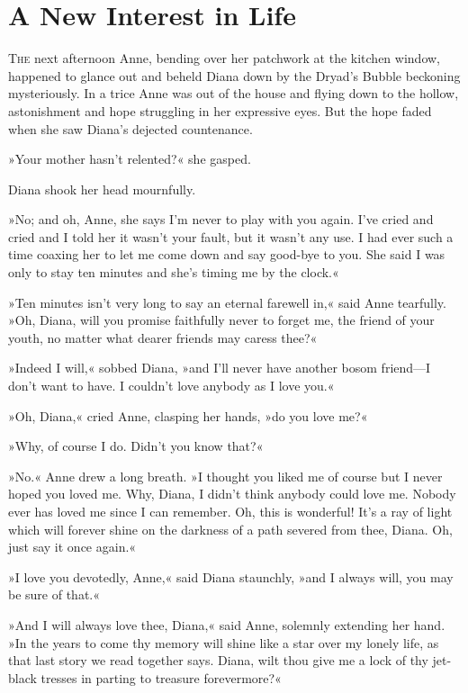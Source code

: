 \chapter{A New Interest in Life}

\lettrine[lines=4]{T}{he} next afternoon Anne, bending over her patchwork at the kitchen window, happened to glance out and beheld Diana down by the Dryad’s Bubble beckoning mysteriously. In a trice Anne was out of the house and flying down to the hollow, astonishment and hope struggling in her expressive eyes. But the hope faded when she saw Diana’s dejected countenance.

»Your mother hasn’t relented?« she gasped.

Diana shook her head mournfully.

»No; and oh, Anne, she says I’m never to play with you again. I’ve cried and cried and I told her it wasn’t your fault, but it wasn’t any use. I had ever such a time coaxing her to let me come down and say good-bye to you. She said I was only to stay ten minutes and she’s timing me by the clock.«

»Ten minutes isn’t very long to say an eternal farewell in,« said Anne tearfully. »Oh, Diana, will you promise faithfully never to forget me, the friend of your youth, no matter what dearer friends may caress thee?«

»Indeed I will,« sobbed Diana, »and I’ll never have another bosom friend—I don’t want to have. I couldn’t love anybody as I love you.«

»Oh, Diana,« cried Anne, clasping her hands, »do you love me?«

»Why, of course I do. Didn’t you know that?«

»No.« Anne drew a long breath. »I thought you liked me of course but I never hoped you loved me. Why, Diana, I didn’t think anybody could love me. Nobody ever has loved me since I can remember. Oh, this is wonderful! It’s a ray of light which will forever shine on the darkness of a path severed from thee, Diana. Oh, just say it once again.«

»I love you devotedly, Anne,« said Diana staunchly, »and I always will, you may be sure of that.«

»And I will always love thee, Diana,« said Anne, solemnly extending her hand. »In the years to come thy memory will shine like a star over my lonely life, as that last story we read together says. Diana, wilt thou give me a lock of thy jet-black tresses in parting to treasure forevermore?«


